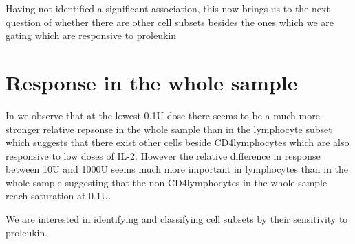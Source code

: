 Having not identified a significant association, this now brings us to the next question of whether there are other
cell subsets besides the ones which we are gating which are responsive to proleukin 



\section{Response in the whole sample}

%


In  we observe that at the lowest 0.1U dose there seems to be a much more stronger relative repsonse
in the whole sample than in the lymphocyte subset which suggests that there exist other cells beside CD4\positive lymphocytes
which are also responsive to low doses of IL-2.  
However the relative difference in response between 10U and 1000U seems much more important in lymphocytes than in the whole sample
suggesting that the non-CD4\positive lymphocytes in the whole sample reach saturation at 0.1U.

We are interested in identifying and classifying cell subsets by their sensitivity to proleukin.

